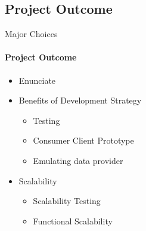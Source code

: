     \subsection{Project Outcome}
    \begin{frame}{Major Choices}\framesubtitle{Project Outcome}   
        \begin{itemize}
            \item<1-> Enunciate
            \item<2-> Benefits of Development Strategy
            \begin{itemize}
                \item<2-> Testing
                \item<2-> Consumer Client Prototype
                \item<2-> Emulating data provider
            \end{itemize}
            \item<3-> Scalability
            \begin{itemize}
                \item<3-> Scalability Testing
                \item<3-> Functional Scalability
            \end{itemize}

\end{itemize}
\end{frame}
